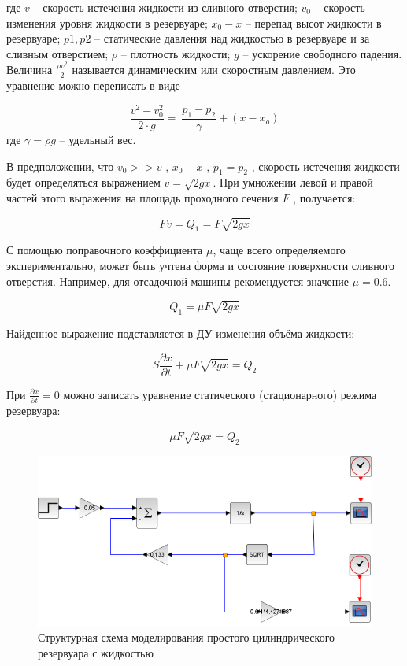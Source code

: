 \documentclass[a4paper, 12pt]{article}
\begin{document}
где $v$ -- скорость истечения жидкости из сливного отверстия; $v_0$ -- скорость изменения уровня жидкости в резервуаре; $x_0 - x$ -- перепад высот жидкости в резервуаре; $p1, p2$ -- статические давления над жидкостью в резервуаре и за сливным отверстием; $\rho$ -- плотность жидкости; $g$ -- ускорение свободного падения. Величина $\frac{\rho v^2}{2}$ называется динамическим или скоростным давлением. Это уравнение можно переписать в виде

$$\frac{v^2-v_0^2}{2 \cdot g}=\ \frac{p_1-p_2}{\gamma}+\left(x-x_o\right)$$
где $\gamma = \rho g$ -- удельный вес.

В предположении, что $v_0 >> v$ , $x_0 - x$ , $p_1 = p_2$ , скорость истечения жидкости будет определяться выражением $v = \sqrt{2 g x}$. При умножении левой и правой частей этого выражения на площадь проходного сечения $F$ , получается: 

$$ Fv = Q_1 = F \sqrt{2gx} $$

С помощью поправочного коэффициента $\mu$, чаще всего определяемого экспериментально, может быть учтена форма и состояние поверхности сливного отверстия. Например, для отсадочной машины рекомендуется значение $\mu = 0.6$.

$$Q_1=\mu F\sqrt{2gx}$$

Найденное выражение подставляется в ДУ изменения объёма жидкости: 

$$ S \frac{\partial x}{\partial t} + \mu F \sqrt{2gx} = Q_2 $$

При $\frac{\partial x}{\partial t} = 0$ можно записать уравнение статического (стационарного) режима резервуара:

$$ \mu F \sqrt{2gx} = Q_2$$

\begin{figure}[h!]
	\centering
	\includegraphics[scale=0.7]{scheme1}
	\caption{Структурная схема моделирования простого цилиндрического резервуара с жидкостью}
	\label{p:Простой_цилиндрический_резервуар_схема}
\end{figure}
\end{document}
